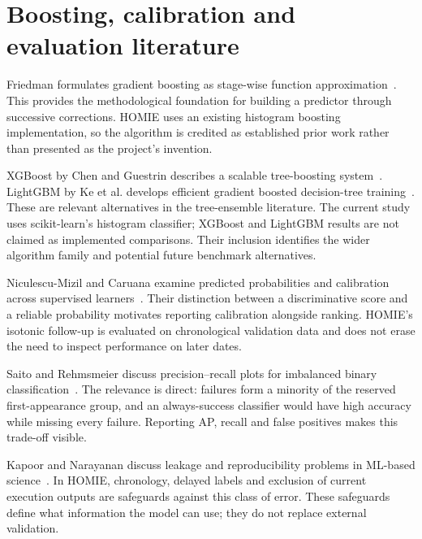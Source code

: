 \documentclass[12pt,a4paper,oneside]{report}
\begin{document}
\section{Boosting, calibration and evaluation literature}
Friedman formulates gradient boosting as stage-wise function approximation~\cite{friedman}. This provides the methodological foundation for building a predictor through successive corrections. HOMIE uses an existing histogram boosting implementation, so the algorithm is credited as established prior work rather than presented as the project's invention.

XGBoost by Chen and Guestrin describes a scalable tree-boosting system~\cite{xgboost}. LightGBM by Ke et al. develops efficient gradient boosted decision-tree training~\cite{lightgbm}. These are relevant alternatives in the tree-ensemble literature. The current study uses scikit-learn's histogram classifier; XGBoost and LightGBM results are not claimed as implemented comparisons. Their inclusion identifies the wider algorithm family and potential future benchmark alternatives.

Niculescu-Mizil and Caruana examine predicted probabilities and calibration across supervised learners~\cite{niculescu}. Their distinction between a discriminative score and a reliable probability motivates reporting calibration alongside ranking. HOMIE's isotonic follow-up is evaluated on chronological validation data and does not erase the need to inspect performance on later dates.

Saito and Rehmsmeier discuss precision--recall plots for imbalanced binary classification~\cite{saito}. The relevance is direct: failures form a minority of the reserved first-appearance group, and an always-success classifier would have high accuracy while missing every failure. Reporting AP, recall and false positives makes this trade-off visible.

Kapoor and Narayanan discuss leakage and reproducibility problems in ML-based science~\cite{leakage}. In HOMIE, chronology, delayed labels and exclusion of current execution outputs are safeguards against this class of error. These safeguards define what information the model can use; they do not replace external validation.
\end{document}
